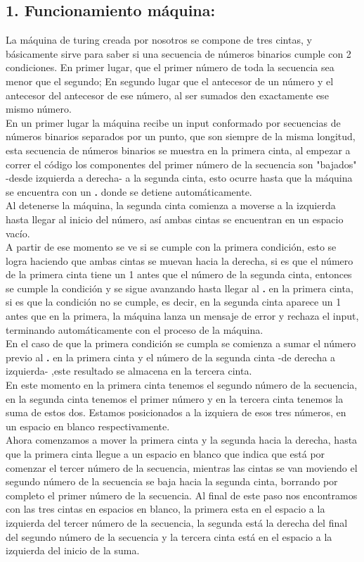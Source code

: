 \documentclass[12pt]{article}
\begin{document}
\subsection*{1. Funcionamiento máquina:}
La máquina de turing creada por nosotros se compone de tres cintas, y básicamente sirve para saber si una secuencia de números binarios cumple con 2 condiciones. En primer lugar, que el primer número de toda la secuencia sea menor que el segundo; En segundo lugar que el antecesor de un número y el antecesor del antecesor de ese número, al ser sumados den exactamente ese mismo número.\\
En un primer lugar la máquina recibe un input conformado por secuencias de números binarios separados por un punto, que son siempre de la misma longitud, esta secuencia de números binarios se muestra en la primera cinta, al empezar a correr el código los componentes del primer número de la secuencia son "bajados" -desde izquierda a derecha- a la segunda cinta, esto ocurre hasta que la máquina se encuentra con un \textbf{.} donde se detiene automáticamente.\\
Al detenerse la máquina, la segunda cinta comienza a moverse a la izquierda hasta llegar al inicio del número, así ambas cintas se encuentran en un espacio vacío.\\
A partir de ese momento se ve si se cumple con la primera condición, esto se logra haciendo que ambas cintas se muevan hacia la derecha, si es que el número de la primera cinta tiene un 1 antes que el número de la segunda cinta, entonces se cumple la condición y se sigue avanzando hasta llegar al \textbf{.} en la primera cinta, si es que la condición no se cumple, es decir, en la segunda cinta aparece un 1 antes que en la primera, la máquina lanza un mensaje de error y rechaza el input, terminando automáticamente con el proceso de la máquina.\\
En el caso de que la primera condición se cumpla se comienza a sumar el número previo al \textbf{.} en la primera cinta y el número de la segunda cinta -de derecha a izquierda- ,este resultado se almacena en la tercera cinta.\\
En este momento en la primera cinta tenemos el segundo número de la secuencia, en la segunda cinta tenemos el primer número y en la tercera cinta tenemos la suma de estos dos. Estamos posicionados a la izquiera de esos tres números, en un espacio en blanco respectivamente.\\
Ahora comenzamos a mover la primera cinta y la segunda hacia la derecha, hasta que la primera cinta llegue a un espacio en blanco que indica que está por comenzar el tercer número de la secuencia, mientras las cintas se van moviendo el segundo número de la secuencia se baja hacia la segunda cinta, borrando por completo el primer número de la secuencia. Al final de este paso nos encontramos con las tres cintas en espacios en blanco, la primera esta en el espacio a la izquierda del tercer número de la secuencia, la segunda está la derecha del final del segundo número de la secuencia y la tercera cinta está en el espacio a la izquierda del inicio de la suma.\\
\end{document}
